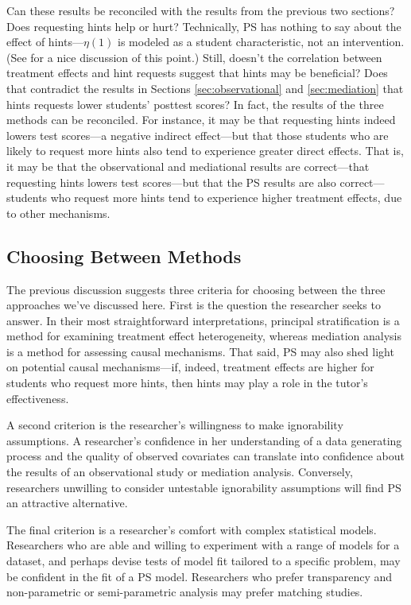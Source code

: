 \documentclass{article}\usepackage[]{graphicx}\usepackage[]{color}
\begin{document}
Can these results be reconciled with the results from the previous two
sections?
Does requesting hints help or hurt?
Technically, PS has nothing to say about the effect of hints---$\eta(1)$
is modeled as a student characteristic, not an intervention.
(See \citealt{jin2008principal} for a nice discussion of this point.)
Still, doesn't the correlation between treatment effects and hint
requests suggest that hints may be beneficial?
Does that contradict the results in Sections \ref{sec:observational}
and \ref{sec:mediation} that hints requests lower students' posttest
scores?
In fact, the results of the three methods can be reconciled.
For instance, it may be that requesting hints indeed lowers test
scores---a negative indirect effect---but that those students who are
likely to request more hints also tend to experience greater direct
effects.
That is, it may be that the observational and mediational results are
correct---that requesting hints lowers test scores---but that the PS
results are also correct---students who request more hints tend to
experience higher treatment effects, due to other mechanisms.

\subsection{Choosing Between Methods}

The previous discussion suggests three criteria for choosing between
the three approaches we've discussed here.
First is the question the researcher seeks to answer.
In their most straightforward interpretations, principal stratification
is a method for examining treatment effect heterogeneity, whereas
mediation analysis is a method for assessing causal mechanisms.
That said, PS may also shed light on potential causal mechanisms---if,
indeed, treatment effects are higher for students who request more
hints, then hints may play a role in the tutor's effectiveness.

A second criterion is the researcher's willingness to make
ignorability assumptions.
A researcher's confidence in her understanding of a data generating
process and the quality of observed covariates can translate into
confidence about the results of an observational study or mediation
analysis.
Conversely, researchers unwilling to consider untestable ignorability
assumptions will find PS an attractive alternative.

The final criterion is a researcher's comfort with complex statistical
models.
Researchers who are able and willing to experiment with a range of
models for a dataset, and perhaps devise tests of model fit tailored
to a specific problem, may be confident in the fit of a PS model.
Researchers who prefer transparency and non-parametric or
semi-parametric analysis may prefer matching studies.
\end{document}

